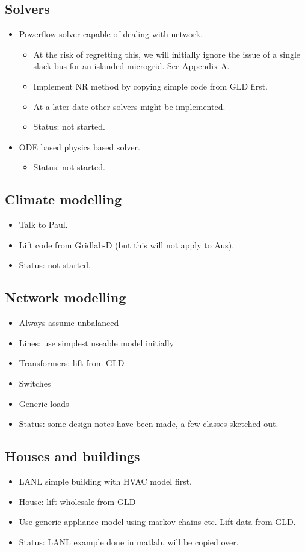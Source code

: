 \documentclass[12pt]{article}
\newcommand{\itm}[1]{\begin{itemize}#1\end{itemize}}
\begin{document}
\subsection{Solvers}
\itm{
	\item Powerflow solver capable of dealing with network.
	\itm{
	\item At the risk of regretting this, we will initially ignore the issue of a single slack bus for an islanded microgrid. See Appendix A.
	\item Implement NR method by copying simple code from GLD first.
	\item At a later date other solvers might be implemented.
	\item Status: not started.
}
	\item ODE based physics based solver.
\itm{
	\item Status: not started.
}
}

\subsection{Climate modelling}
\itm{
	\item Talk to Paul.
	\item Lift code from Gridlab-D (but this will not apply to Aus).
	\item Status: not started.
}

\subsection{Network modelling}
\itm{
	\item Always assume unbalanced
	\item Lines: use simplest useable model initially
	\item Transformers: lift from GLD
	\item Switches
	\item Generic loads
	\item Status: some design notes have been made, a few classes sketched out.
}

\subsection{Houses and buildings}
\itm{
	\item LANL simple building with HVAC model first.
	\item House: lift wholesale from GLD
	\item Use generic appliance model using markov chains etc. Lift data from GLD.
	\item Status: LANL example done in matlab, will be copied over.
}
\end{document}

